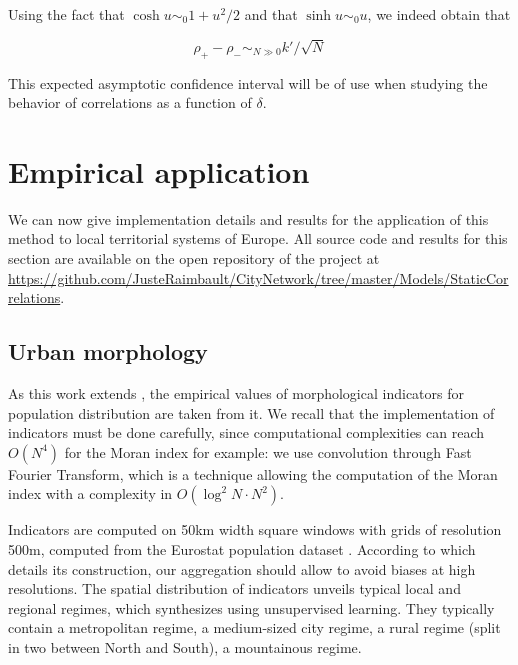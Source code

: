 Using the fact that $\cosh u \sim_0 1 + u^2/2$ and that $\sinh u \sim_0 u$, we indeed obtain that 

\begin{equation}
\rho_{+} - \rho_{-} \sim_{N\gg 0} k' / \sqrt{N}
\label{eq:confidenceinterval}
\end{equation}

This expected asymptotic confidence interval will be of use when studying the behavior of correlations as a function of $\delta$.




\section{Empirical application}

We can now give implementation details and results for the application of this method to local territorial systems of Europe. All source code and results for this section are available on the open repository of the project at \url{https://github.com/JusteRaimbault/CityNetwork/tree/master/Models/StaticCorrelations}.

\subsection{Urban morphology}

As this work extends \cite{2017arXiv170806743R}, the empirical values of morphological indicators for population distribution are taken from it. We recall that the implementation of indicators must be done carefully, since computational complexities can reach $O(N^4)$ for the Moran index for example: we use convolution through Fast Fourier Transform, which is a technique allowing the computation of the Moran index with a complexity in $O(\log^2 N \cdot N^2)$.

Indicators are computed on 50km width square windows with grids of resolution 500m, computed from the Eurostat population dataset \citep{eurostat}. According to \cite{batista2013high} which details its construction, our aggregation should allow  to avoid biases at high resolutions. The spatial distribution of indicators unveils typical local and regional regimes, which \cite{2017arXiv170806743R} synthesizes using unsupervised learning. They typically contain a metropolitan regime, a medium-sized city regime, a rural regime (split in two between North and South), a mountainous regime.



